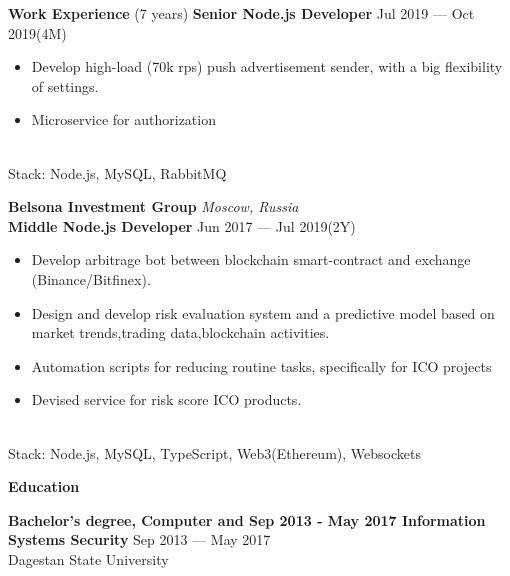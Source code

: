 \documentclass{resume} %
\begin{document}
\begin{rSection}{\textbf{Work Experience} (7 years) }
\textbf{Senior Node.js Developer} \hfill Jul 2019 --- Oct 2019(4M)
\begin{itemize}
    \setlength\itemsep{-0.4em}
    \item Develop high-load (70k rps) push advertisement sender, with a big flexibility of settings.
    \item Microservice for authorization
\end{itemize}
\\Stack: Node.js, MySQL, RabbitMQ

\textbf{Belsona Investment Group} \hfill \textit{Moscow, Russia} \\
\textbf{Middle Node.js Developer}  \hfill Jun 2017 --- Jul 2019(2Y)

\begin{itemize}
    \setlength\itemsep{-0.4em}
    \item Develop arbitrage bot between blockchain smart-contract and exchange (Binance/Bitfinex).
    \item Design and develop risk evaluation system and a predictive model based on market trends,trading data,blockchain activities.
    \item Automation scripts for reducing routine tasks, specifically for ICO projects
    \item Devised service for risk score ICO products.
\end{itemize}
\\Stack: Node.js, MySQL, TypeScript, Web3(Ethereum), Websockets

\end{rSection}



\begin{rSection}{\textbf{Education}}

\textbf{Bachelor's degree, Computer and Sep 2013 - May 2017 Information Systems Security} \hfill {Sep 2013 --- May 2017} \\
	  Dagestan State University

\end{rSection}
\end{document}
